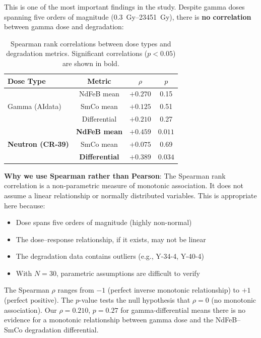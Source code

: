 \documentclass[11pt,letterpaper]{article}
\begin{document}
This is one of the most important findings in the study. Despite gamma doses
spanning five orders of magnitude (\SIrange{0.3}{23451}{Gy}), there is
\textbf{no correlation} between gamma dose and degradation:

\begin{table}[H]
\centering
\caption{Spearman rank correlations between dose types and degradation metrics.
Significant correlations ($p < 0.05$) are shown in bold.}
\label{tab:correlations}
\begin{tabular}{@{}lccc@{}}
\toprule
\textbf{Dose Type} & \textbf{Metric} & $\rho$ & $p$ \\
\midrule
\multirow{3}{*}{Gamma (AIdata)} & NdFeB mean & $+0.270$ & 0.15 \\
 & SmCo mean & $+0.125$ & 0.51 \\
 & Differential & $+0.210$ & 0.27 \\
\midrule
\multirow{3}{*}{\textbf{Neutron (CR-39)}} & \textbf{NdFeB mean} & $\mathbf{+0.459}$ & $\mathbf{0.011}$ \\
 & SmCo mean & $+0.075$ & 0.69 \\
 & \textbf{Differential} & $\mathbf{+0.389}$ & $\mathbf{0.034}$ \\
\bottomrule
\end{tabular}
\end{table}

\textbf{Why we use Spearman rather than Pearson}: The Spearman rank correlation
is a non-parametric measure of monotonic association. It does not assume a
linear relationship or normally distributed variables. This is appropriate here
because:
\begin{itemize}
    \item Dose spans five orders of magnitude (highly non-normal)
    \item The dose--response relationship, if it exists, may not be linear
    \item The degradation data contains outliers (e.g., Y-34-4, Y-40-4)
    \item With $N = 30$, parametric assumptions are difficult to verify
\end{itemize}

The Spearman $\rho$ ranges from $-1$ (perfect inverse monotonic relationship)
to $+1$ (perfect positive). The $p$-value tests the null hypothesis that $\rho
= 0$ (no monotonic association). Our $\rho = 0.210$, $p = 0.27$ for
gamma-differential means there is no evidence for a monotonic relationship
between gamma dose and the NdFeB--SmCo degradation differential.
\end{document}
